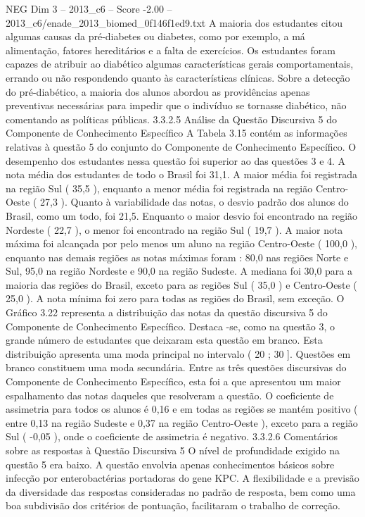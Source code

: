 \begin{textsample}{NEG Dim 3 – 2013\_c6 – Score -2.00 – 2013\_c6/enade\_2013\_biomed\_0f146f1ed9.txt}
A maioria dos estudantes citou algumas causas da pré-diabetes ou diabetes, como por exemplo, a má alimentação, fatores hereditários e a falta de exercícios.
Os estudantes foram capazes de atribuir ao diabético algumas características gerais comportamentais, errando ou não respondendo quanto às características clínicas.
Sobre a detecção do pré-diabético, a maioria dos alunos abordou as providências apenas preventivas necessárias para impedir que o indivíduo se tornasse diabético, não comentando as políticas públicas. 3.3.2.5 Análise da Questão Discursiva 5 do Componente de Conhecimento Específico A Tabela 3.15 contém as informações relativas à questão 5 do conjunto do Componente de Conhecimento Específico.
O desempenho dos estudantes nessa questão foi superior ao das questões 3 e 4.
A nota média dos estudantes de todo o Brasil foi 31,1.
A maior média foi registrada na região Sul ( 35,5 ), enquanto a menor média foi registrada na região Centro-Oeste ( 27,3 ).
Quanto à variabilidade das notas, o desvio padrão dos alunos do Brasil, como um todo, foi 21,5.
Enquanto o maior desvio foi encontrado na região Nordeste ( 22,7 ), o menor foi encontrado na região Sul ( 19,7 ).
A maior nota máxima foi alcançada por pelo menos um aluno na região Centro-Oeste ( 100,0 ), enquanto nas demais regiões as notas máximas foram : 80,0 nas regiões Norte e Sul, 95,0 na região Nordeste e 90,0 na região Sudeste.
A mediana foi 30,0 para a maioria das regiões do Brasil, exceto para as regiões Sul ( 35,0 ) e Centro-Oeste ( 25,0 ).
A nota mínima foi zero para todas as regiões do Brasil, sem exceção.
O Gráfico 3.22 representa a distribuição das notas da questão discursiva 5 do Componente de Conhecimento Específico.
Destaca -se, como na questão 3, o grande número de estudantes que deixaram esta questão em branco.
Esta distribuição apresenta uma moda principal no intervalo ( 20 ; 30 ].
Questões em branco constituem uma moda secundária.
Entre as três questões discursivas do Componente de Conhecimento Específico, esta foi a que apresentou um maior espalhamento das notas daqueles que resolveram a questão.
O coeficiente de assimetria para todos os alunos é 0,16 e em todas as regiões se mantém positivo ( entre 0,13 na região Sudeste e 0,37 na região Centro-Oeste ), exceto para a região Sul ( -0,05 ), onde o coeficiente de assimetria é negativo. 3.3.2.6 Comentários sobre as respostas à Questão Discursiva 5 O nível de profundidade exigido na questão 5 era baixo.
A questão envolvia apenas conhecimentos básicos sobre infecção por enterobactérias portadoras do gene KPC.
A flexibilidade e a previsão da diversidade das respostas consideradas no padrão de resposta, bem como uma boa subdivisão dos critérios de pontuação, facilitaram o trabalho de correção.

\end{textsample}
